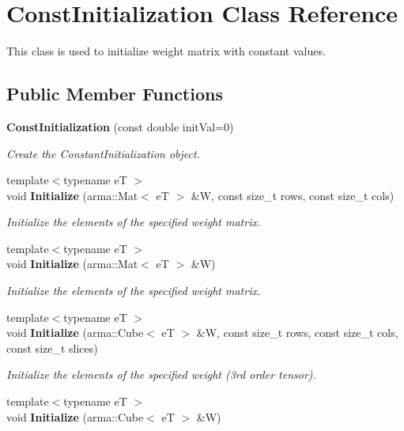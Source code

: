 \section{Const\+Initialization Class Reference}
\label{classmlpack_1_1ann_1_1ConstInitialization}


This class is used to initialize weight matrix with constant values.  


\subsection*{Public Member Functions}
\begin{DoxyCompactItemize}
\item 
\textbf{ Const\+Initialization} (const double init\+Val=0)
\begin{DoxyCompactList}\small\item\em Create the Constant\+Initialization object. \end{DoxyCompactList}\item 
{\footnotesize template$<$typename eT $>$ }\\void \textbf{ Initialize} (arma\+::\+Mat$<$ eT $>$ \&W, const size\+\_\+t rows, const size\+\_\+t cols)
\begin{DoxyCompactList}\small\item\em Initialize the elements of the specified weight matrix. \end{DoxyCompactList}\item 
{\footnotesize template$<$typename eT $>$ }\\void \textbf{ Initialize} (arma\+::\+Mat$<$ eT $>$ \&W)
\begin{DoxyCompactList}\small\item\em Initialize the elements of the specified weight matrix. \end{DoxyCompactList}\item 
{\footnotesize template$<$typename eT $>$ }\\void \textbf{ Initialize} (arma\+::\+Cube$<$ eT $>$ \&W, const size\+\_\+t rows, const size\+\_\+t cols, const size\+\_\+t slices)
\begin{DoxyCompactList}\small\item\em Initialize the elements of the specified weight (3rd order tensor). \end{DoxyCompactList}\item 
{\footnotesize template$<$typename eT $>$ }\\void \textbf{ Initialize} (arma\+::\+Cube$<$ eT $>$ \&W)

\end{DoxyCompactItemize}
